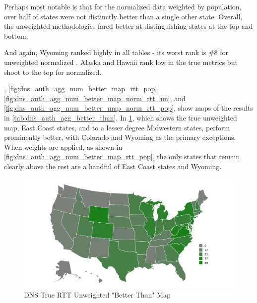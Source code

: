 

Perhaps most notable is that for the normalized \rtt data weighted by population, over half of states were not distinctly better than a single other state. Overall, the unweighted methodologies fared better at distinguishing states at the top and bottom. 

And again, Wyoming ranked highly in all tables - its worst rank is \#8 for unweighted normalized \rtt. Alaska and Hawaii rank low in the true \rtt metrics but shoot to the top for normalized.

, \cref{fig:dns_auth_agg_num_better_map_rtt_pop}, \cref{fig:dns_auth_agg_num_better_map_norm_rtt_un}, and \cref{fig:dns_auth_agg_num_better_map_norm_rtt_pop}, show maps of the results in \cref{tab:dns_auth_agg_better_than}. In \cref{fig:dns_auth_agg_num_better_map_rtt_un}, which shows the true \rtt unweighted map, East Coast states, and to a lesser degree Midwestern states, perform prominently better, with Colorado and Wyoming as the primary exceptions. When weights are applied, as shown in \cref{fig:dns_auth_agg_num_better_map_rtt_pop}, the only states that remain clearly above the rest are a handful of East Coast states and Wyoming.

\begin{figure}
    \centering
    \includegraphics{images/dns/analysis_auth_agg/rtt/unweighted/num_better_than_map_rtt_un.png}
    \caption{DNS True RTT Unweighted "Better Than" Map}
    \label{fig:dns_auth_agg_num_better_map_rtt_un}
\end{figure}

